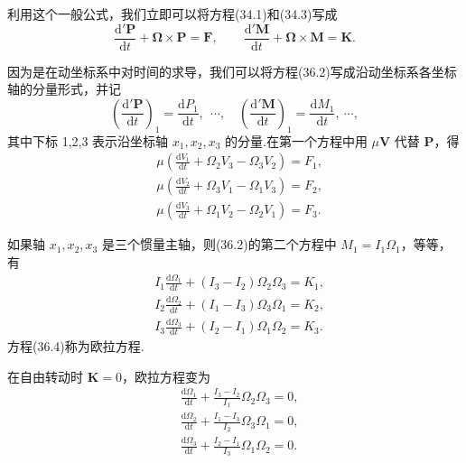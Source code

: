 利用这个一般公式，我们立即可以将方程(34.1)和(34.3)写成
\begin{equation}
  \frac{\mathrm{d}'\boldsymbol{P}}{\mathrm{d}t}
  +\boldsymbol{\Omega}\times\boldsymbol{P}=\boldsymbol{F},
  \qquad
  \frac{\mathrm{d}'\boldsymbol{M}}{\mathrm{d}t}
  +\boldsymbol{\Omega}\times\boldsymbol{M}=\boldsymbol{K}.
\end{equation}

因为是在动坐标系中对时间的求导，我们可以将方程(36.2)写成沿动坐标系各坐标轴的分量形式，并记
\begin{equation*}
  \left(\frac{\mathrm{d}'\boldsymbol{P}}{\mathrm{d}t}\right)_1
  =\frac{\mathrm{d}P_1}{\mathrm{d}t},\ \ \cdots,\quad
  \left(\frac{\mathrm{d}'\boldsymbol{M}}{\mathrm{d}t}\right)_1
  =\frac{\mathrm{d}M_1}{\mathrm{d}t},\ \cdots,
\end{equation*}
其中下标 1,2,3 表示沿坐标轴 $x_1,x_2,x_3$ 的分量.在第一个方程中用 $\mu\boldsymbol{V}$ 代替 $\boldsymbol{P}$，得
\begin{equation}
\begin{aligned}
  &\mu\left(\frac{\mathrm{d}V_1}{\mathrm{d}t}
  +\Omega_2V_3-\Omega_3V_2\right)=F_1,\\
  &\mu\left(\frac{\mathrm{d}V_2}{\mathrm{d}t}
  +\Omega_3V_1-\Omega_1V_3\right)=F_2,\\
  &\mu\left(\frac{\mathrm{d}V_3}{\mathrm{d}t}
  +\Omega_1V_2-\Omega_2V_1\right)=F_3.
\end{aligned}
\end{equation}

如果轴 $x_1,x_2,x_3$ 是三个惯量主轴，则(36.2)的第二个方程中 $M_1=I_1\Omega_1$，等等，有
\begin{equation}
\begin{aligned}
  &I_1\frac{\mathrm{d}\Omega_1}{\mathrm{d}t}
  +\left(I_3-I_2\right)\Omega_2\Omega_3=K_1,\\
  &I_2\frac{\mathrm{d}\Omega_2}{\mathrm{d}t}
  +\left(I_1-I_3\right)\Omega_3\Omega_1=K_2,\\
  &I_3\frac{\mathrm{d}\Omega_3}{\mathrm{d}t}
  +\left(I_2-I_1\right)\Omega_1\Omega_2=K_3.
\end{aligned}
\end{equation}
方程(36.4)称为欧拉方程.

在自由转动时 $\boldsymbol{K}=0$，欧拉方程变为
\begin{equation}
\begin{aligned}
  &\frac{\mathrm{d}\Omega_1}{\mathrm{d}t}
  +\frac{I_3-I_2}{I_1}\Omega_2\Omega_3=0,\\
  &\frac{\mathrm{d}\Omega_2}{\mathrm{d}t}
  +\frac{I_1-I_3}{I_2}\Omega_3\Omega_1=0,\\
  &\frac{\mathrm{d}\Omega_3}{\mathrm{d}t}
  +\frac{I_2-I_1}{I_3}\Omega_1\Omega_2=0.
\end{aligned}
\end{equation}

